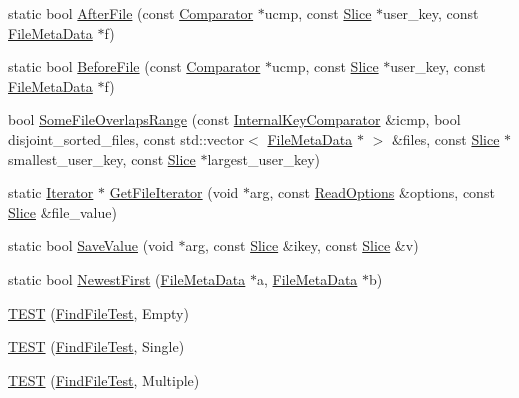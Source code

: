\begin{DoxyCompactItemize}
\item 
static bool \hyperlink{namespaceleveldb_a7f9c247b8bae634426f95a6a4443ebfc}{After\+File} (const \hyperlink{structleveldb_1_1_comparator}{Comparator} $\ast$ucmp, const \hyperlink{classleveldb_1_1_slice}{Slice} $\ast$user\+\_\+key, const \hyperlink{structleveldb_1_1_file_meta_data}{File\+Meta\+Data} $\ast$f)
\item 
static bool \hyperlink{namespaceleveldb_ad320b62435f131ca2217d00425cae151}{Before\+File} (const \hyperlink{structleveldb_1_1_comparator}{Comparator} $\ast$ucmp, const \hyperlink{classleveldb_1_1_slice}{Slice} $\ast$user\+\_\+key, const \hyperlink{structleveldb_1_1_file_meta_data}{File\+Meta\+Data} $\ast$f)
\item 
bool \hyperlink{namespaceleveldb_a1a6a370f17b20667b885b5b91159c5a9}{Some\+File\+Overlaps\+Range} (const \hyperlink{classleveldb_1_1_internal_key_comparator}{Internal\+Key\+Comparator} \&icmp, bool disjoint\+\_\+sorted\+\_\+files, const std\+::vector$<$ \hyperlink{structleveldb_1_1_file_meta_data}{File\+Meta\+Data} $\ast$ $>$ \&files, const \hyperlink{classleveldb_1_1_slice}{Slice} $\ast$smallest\+\_\+user\+\_\+key, const \hyperlink{classleveldb_1_1_slice}{Slice} $\ast$largest\+\_\+user\+\_\+key)
\item 
static \hyperlink{classleveldb_1_1_iterator}{Iterator} $\ast$ \hyperlink{namespaceleveldb_a90825bb2cdcea64469b179f6d9c5de00}{Get\+File\+Iterator} (void $\ast$arg, const \hyperlink{structleveldb_1_1_read_options}{Read\+Options} \&options, const \hyperlink{classleveldb_1_1_slice}{Slice} \&file\+\_\+value)
\item 
static bool \hyperlink{namespaceleveldb_ab84b248b496c0ec1a77af5910b49100a}{Save\+Value} (void $\ast$arg, const \hyperlink{classleveldb_1_1_slice}{Slice} \&ikey, const \hyperlink{classleveldb_1_1_slice}{Slice} \&v)
\item 
static bool \hyperlink{namespaceleveldb_ab65191269f2a256a310edf82d56ed842}{Newest\+First} (\hyperlink{structleveldb_1_1_file_meta_data}{File\+Meta\+Data} $\ast$a, \hyperlink{structleveldb_1_1_file_meta_data}{File\+Meta\+Data} $\ast$b)
\item 
\hyperlink{namespaceleveldb_a188b103f7d0b4ade94f516f01a09aa06}{T\+E\+S\+T} (\hyperlink{classleveldb_1_1_find_file_test}{Find\+File\+Test}, Empty)
\item 
\hyperlink{namespaceleveldb_aede67af3ba40cb44c1ff914d7074ba48}{T\+E\+S\+T} (\hyperlink{classleveldb_1_1_find_file_test}{Find\+File\+Test}, Single)
\item 
\hyperlink{namespaceleveldb_a6ae343add2f7159a8d66341f271a99c2}{T\+E\+S\+T} (\hyperlink{classleveldb_1_1_find_file_test}{Find\+File\+Test}, Multiple)

\end{DoxyCompactItemize}
